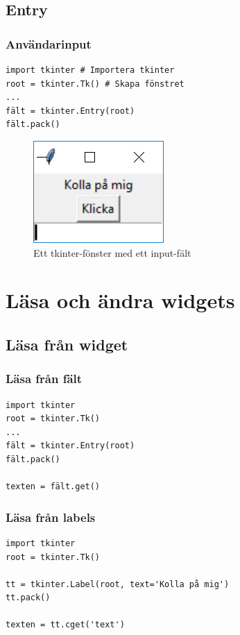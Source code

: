 \documentclass[aspectratio=169]{beamer}
\begin{document}
\subsection{Entry}

\begin{frame}[fragile]
\frametitle{Användarinput}

\begin{lstlisting}
import tkinter # Importera tkinter
root = tkinter.Tk() # Skapa fönstret
...
fält = tkinter.Entry(root)
fält.pack()
\end{lstlisting}

\begin{figure}
\begin{center}
\includegraphics[]{win4.png}
\caption{Ett tkinter-fönster med ett input-fält}
\end{center}
\end{figure}

\end{frame}

\section{Läsa och ändra widgets}

\subsection{Läsa från widget}

\begin{frame}[fragile]
\frametitle{Läsa från fält}

\begin{lstlisting}
import tkinter
root = tkinter.Tk()
...
fält = tkinter.Entry(root)
fält.pack()

texten = fält.get()
\end{lstlisting}

\end{frame}

\begin{frame}[fragile]
\frametitle{Läsa från labels}

\begin{lstlisting}
import tkinter
root = tkinter.Tk()

tt = tkinter.Label(root, text='Kolla på mig')
tt.pack()

texten = tt.cget('text')
\end{lstlisting}

\end{frame}
\end{document}
